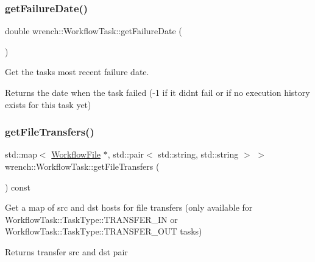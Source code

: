 \subsubsection{\texorpdfstring{get\+Failure\+Date()}{getFailureDate()}}
{\footnotesize\ttfamily double wrench\+::\+Workflow\+Task\+::get\+Failure\+Date (\begin{DoxyParamCaption}{ }\end{DoxyParamCaption})}



Get the task\textquotesingle{}s most recent failure date. 

\begin{DoxyReturn}{Returns}
the date when the task failed (-\/1 if it didn\textquotesingle{}t fail or if no execution history exists for this task yet) 
\end{DoxyReturn}
\mbox{\label{classwrench_1_1_workflow_task_a1c453e7b1570418be500c9910372956b}} 
\subsubsection{\texorpdfstring{get\+File\+Transfers()}{getFileTransfers()}}
{\footnotesize\ttfamily std\+::map$<$ \hyperlink{classwrench_1_1_workflow_file}{Workflow\+File} $\ast$, std\+::pair$<$ std\+::string, std\+::string $>$ $>$ wrench\+::\+Workflow\+Task\+::get\+File\+Transfers (\begin{DoxyParamCaption}{ }\end{DoxyParamCaption}) const}



Get a map of src and dst hosts for file transfers (only available for Workflow\+Task\+::\+Task\+Type\+::\+T\+R\+A\+N\+S\+F\+E\+R\+\_\+\+IN or Workflow\+Task\+::\+Task\+Type\+::\+T\+R\+A\+N\+S\+F\+E\+R\+\_\+\+O\+UT tasks) 

\begin{DoxyReturn}{Returns}
transfer src and dst pair 
\end{DoxyReturn}
\mbox{\label{classwrench_1_1_workflow_task_aec0aab3ed552960729a60d1d3c4a3de2}} 

